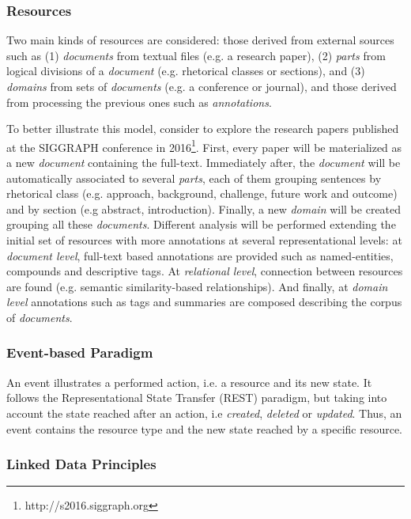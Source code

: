 \subsubsection{Resources}

Two main kinds of resources are considered: those derived from external sources such as (1) \textit{documents} from textual files (e.g. a research paper), (2) \textit{parts} from logical divisions of a \textit{document} (e.g. rhetorical classes or sections), and (3) \textit{domains} from sets of \textit{documents} (e.g. a conference or journal), and those derived from processing the previous ones such as \textit{annotations}. 

To better illustrate this model, consider to explore the research papers published at the SIGGRAPH conference in 2016\footnote{http://s2016.siggraph.org}. First, every paper will be materialized as a new \textit{document} containing the full-text. Immediately after, the \textit{document} will be automatically associated to several \textit{parts}, each of them grouping sentences by rhetorical class (e.g. approach, background, challenge, future work and outcome) and by section (e.g abstract, introduction). Finally, a new \textit{domain} will be created grouping all these \textit{documents}. Different analysis will be performed extending the initial set of resources with more annotations at several representational levels: at \textit{document level}, full-text based annotations are provided such as named-entities, compounds and descriptive tags. At \textit{relational level}, connection between resources are found (e.g. semantic similarity-based relationships). And finally, at \textit{domain level} annotations such as tags and summaries are composed describing the corpus of \textit{documents}.

\subsubsection{Event-based Paradigm}

An event illustrates a performed action, i.e. a resource and its new state. It follows the Representational State Transfer (REST)\cite{Fielding2002} paradigm, but taking into account the state reached after an action, i.e \textit{created}, \textit{deleted} or \textit{updated}. Thus, an event contains the resource type and the new state reached by a specific resource.


\subsubsection{Linked Data Principles }

